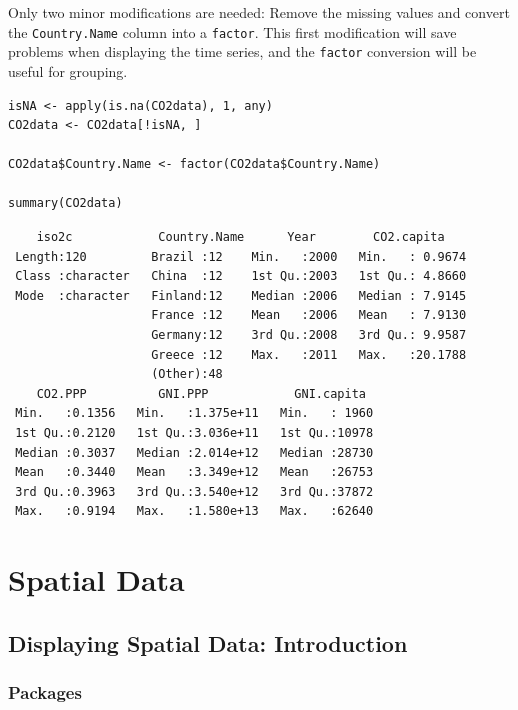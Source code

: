\documentclass[smallroyalvopaper]{memoir}
\begin{document}
Only two minor modifications are needed: Remove the missing values and
convert the \texttt{Country.Name} column into a \texttt{factor}. This first
modification will save problems when displaying the time series, and
the \texttt{factor} conversion will be useful for grouping.

\lstset{language=r,label= ,caption= ,captionpos=b,numbers=none}
\begin{lstlisting}
isNA <- apply(is.na(CO2data), 1, any)
CO2data <- CO2data[!isNA, ]

CO2data$Country.Name <- factor(CO2data$Country.Name)

summary(CO2data)
\end{lstlisting}

\begin{verbatim}
    iso2c            Country.Name      Year        CO2.capita     
 Length:120         Brazil :12    Min.   :2000   Min.   : 0.9674  
 Class :character   China  :12    1st Qu.:2003   1st Qu.: 4.8660  
 Mode  :character   Finland:12    Median :2006   Median : 7.9145  
                    France :12    Mean   :2006   Mean   : 7.9130  
                    Germany:12    3rd Qu.:2008   3rd Qu.: 9.9587  
                    Greece :12    Max.   :2011   Max.   :20.1788  
                    (Other):48                                    
    CO2.PPP          GNI.PPP            GNI.capita   
 Min.   :0.1356   Min.   :1.375e+11   Min.   : 1960  
 1st Qu.:0.2120   1st Qu.:3.036e+11   1st Qu.:10978  
 Median :0.3037   Median :2.014e+12   Median :28730  
 Mean   :0.3440   Mean   :3.349e+12   Mean   :26753  
 3rd Qu.:0.3963   3rd Qu.:3.540e+12   3rd Qu.:37872  
 Max.   :0.9194   Max.   :1.580e+13   Max.   :62640
\end{verbatim}

\part{Spatial Data}
\label{sec:orgb6f1649}

\chapter{Displaying Spatial Data: Introduction}
\label{sec:orgd19e247}
\label{cha:spatialIntro}

\section{Packages}
\label{sec:org57e58e7}
\label{sec:spatial-packages}
\end{document}
